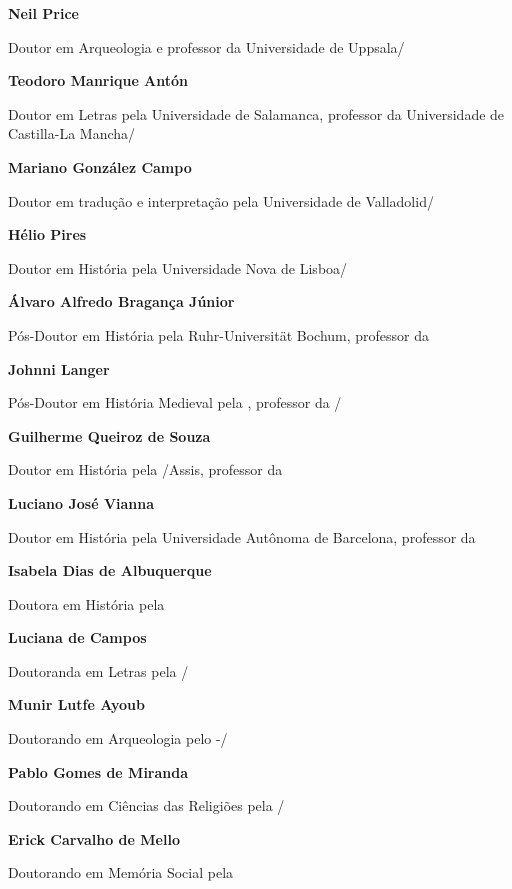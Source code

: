 \begingroup\centering
\vspace*{3cm}
\pagestyle{empty}

\textbf{Neil Price}

Doutor em Arqueologia e professor da Universidade de Uppsala/
\medskip

\textbf{Teodoro Manrique Antón}

Doutor em Letras pela Universidade de Salamanca, professor da
Universidade de Castilla-La Mancha/
\medskip

\textbf{Mariano González Campo}

Doutor em tradução e interpretação pela Universidade de Valladolid/
\medskip

\textbf{Hélio Pires}

Doutor em História pela Universidade Nova de Lisboa/
\medskip

\textbf{Álvaro Alfredo Bragança Júnior}

Pós-Doutor em História pela Ruhr-Universität Bochum, professor da 
\medskip

\textbf{Johnni Langer}

Pós-Doutor em História Medieval pela , professor da /
\medskip

\textbf{Guilherme Queiroz de Souza }

Doutor em História pela /Assis, professor da 
\medskip

\textbf{Luciano José Vianna}

Doutor em História pela Universidade Autônoma de Barcelona, professor da
\medskip

\textbf{Isabela Dias de Albuquerque}

Doutora em História pela 
\medskip

\textbf{Luciana de Campos}

Doutoranda em Letras pela /
\medskip

\pagebreak
\textbf{Munir Lutfe Ayoub}

Doutorando em Arqueologia pelo -/
\medskip

\textbf{Pablo Gomes de Miranda}

Doutorando em Ciências das Religiões pela /
\medskip

\textbf{Erick Carvalho de Mello}

Doutorando em Memória Social pela 
\medskip

